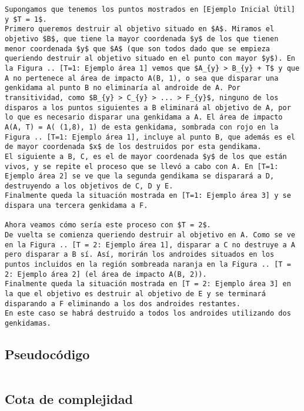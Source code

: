 \documentclass[10pt,a4paper]{article}
\begin{document}
\begin{verbatim}
Supongamos que tenemos los puntos mostrados en [Ejemplo Inicial Útil] y $T = 1$.
Primero queremos destruir al objetivo situado en $A$. Miramos el objetivo $B$, que tiene la mayor coordenada $y$ de los que tienen menor coordenada $y$ que $A$ (que son todos dado que se empieza queriendo destruir al objetivo situado en el punto con mayor $y$). En la Figura .. [T=1: Ejemplo área 1] vemos que $A_{y} > B_{y} + T$ y que A no pertenece al área de impacto A(B, 1), o sea que disparar una genkidama al punto B no eliminaría al androide de A. Por transitividad, como $B_{y} > C_{y} > ... > F_{y}$, ninguno de los disparos a los puntos siguientes a B eliminará al objetivo de A, por lo que es necesario disparar una genkidama a A. El área de impacto A(A, T) = A( (1,8), 1) de esta genkidama, sombrada con rojo en la Figura .. [T=1: Ejemplo área 1], incluye al punto B, que además es el de mayor coordenada $x$ de los destruidos por esta gendikama. 
El siguiente a B, C, es el de mayor coordenada $y$ de los que están vivos, y se repite el proceso que se llevó a cabo con A. En [T=1: Ejemplo área 2] se ve que la segunda gendikama se disparará a D, destruyendo a los objetivos de C, D y E.
Finalmente queda la situación mostrada en [T=1: Ejemplo área 3] y se dispara una tercera genkidama a F.

Ahora veamos cómo sería este proceso con $T = 2$.
De vuelta se comienza queriendo destruir al objetivo en A. Como se ve en la Figura .. [T = 2: Ejemplo área 1], disparar a C no destruye a A pero disparar a B sí. Así, morirán los androides situados en los puntos incluidos en la región sombreada naranja en la Figura .. [T = 2: Ejemplo área 2] (el área de impacto A(B, 2)).
Finalmente queda la situación mostrada en [T = 2: Ejemplo área 3] en la que el objetivo es destruir al objetivo de E y se terminará disparando a F eliminando a los dos androides restantes.
En este caso se habrá destruido a todos los androides utilizando dos genkidamas.
\end{verbatim}

\subsection{Pseudocódigo}
\begin{verbatim}
\end{verbatim}

\subsection{Cota de complejidad}
\begin{verbatim}
\end{verbatim}
\end{document}
